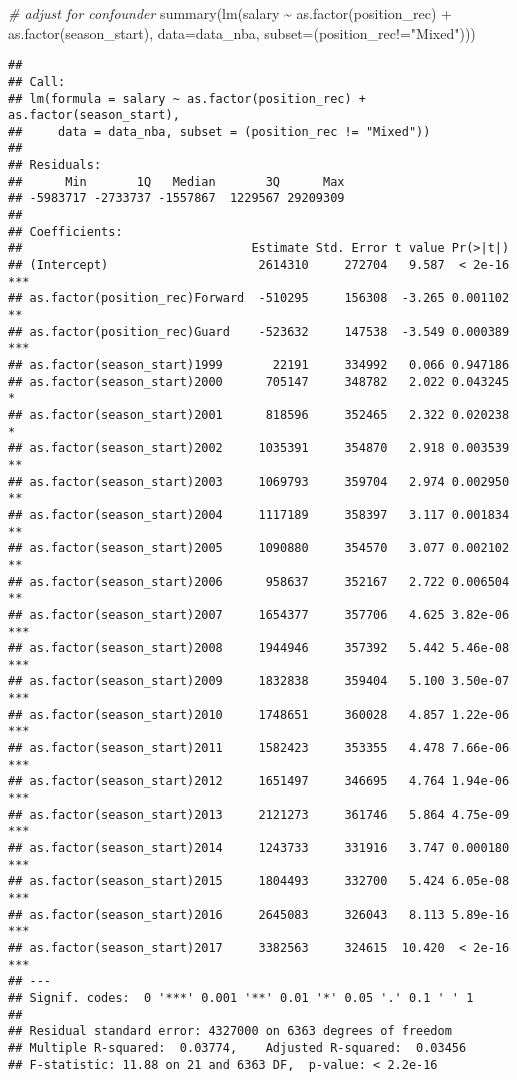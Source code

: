 \documentclass[
]{book}
\newenvironment{Shaded}{\begin{snugshade}}{\end{snugshade}}
\newcommand{\AttributeTok}[1]{\textcolor[rgb]{0.77,0.63,0.00}{#1}}
\newcommand{\CommentTok}[1]{\textcolor[rgb]{0.56,0.35,0.01}{\textit{#1}}}
\newcommand{\FunctionTok}[1]{\textcolor[rgb]{0.00,0.00,0.00}{#1}}
\newcommand{\NormalTok}[1]{#1}
\newcommand{\SpecialCharTok}[1]{\textcolor[rgb]{0.00,0.00,0.00}{#1}}
\newcommand{\StringTok}[1]{\textcolor[rgb]{0.31,0.60,0.02}{#1}}
\begin{document}
\begin{Shaded}
\begin{Highlighting}[]
\CommentTok{\# adjust for confounder }
\FunctionTok{summary}\NormalTok{(}\FunctionTok{lm}\NormalTok{(salary }\SpecialCharTok{\textasciitilde{}} \FunctionTok{as.factor}\NormalTok{(position\_rec) }\SpecialCharTok{+} \FunctionTok{as.factor}\NormalTok{(season\_start), }\AttributeTok{data=}\NormalTok{data\_nba, }\AttributeTok{subset=}\NormalTok{(position\_rec}\SpecialCharTok{!=}\StringTok{"Mixed"}\NormalTok{)))}
\end{Highlighting}
\end{Shaded}

\begin{verbatim}
## 
## Call:
## lm(formula = salary ~ as.factor(position_rec) + as.factor(season_start), 
##     data = data_nba, subset = (position_rec != "Mixed"))
## 
## Residuals:
##      Min       1Q   Median       3Q      Max 
## -5983717 -2733737 -1557867  1229567 29209309 
## 
## Coefficients:
##                                Estimate Std. Error t value Pr(>|t|)    
## (Intercept)                     2614310     272704   9.587  < 2e-16 ***
## as.factor(position_rec)Forward  -510295     156308  -3.265 0.001102 ** 
## as.factor(position_rec)Guard    -523632     147538  -3.549 0.000389 ***
## as.factor(season_start)1999       22191     334992   0.066 0.947186    
## as.factor(season_start)2000      705147     348782   2.022 0.043245 *  
## as.factor(season_start)2001      818596     352465   2.322 0.020238 *  
## as.factor(season_start)2002     1035391     354870   2.918 0.003539 ** 
## as.factor(season_start)2003     1069793     359704   2.974 0.002950 ** 
## as.factor(season_start)2004     1117189     358397   3.117 0.001834 ** 
## as.factor(season_start)2005     1090880     354570   3.077 0.002102 ** 
## as.factor(season_start)2006      958637     352167   2.722 0.006504 ** 
## as.factor(season_start)2007     1654377     357706   4.625 3.82e-06 ***
## as.factor(season_start)2008     1944946     357392   5.442 5.46e-08 ***
## as.factor(season_start)2009     1832838     359404   5.100 3.50e-07 ***
## as.factor(season_start)2010     1748651     360028   4.857 1.22e-06 ***
## as.factor(season_start)2011     1582423     353355   4.478 7.66e-06 ***
## as.factor(season_start)2012     1651497     346695   4.764 1.94e-06 ***
## as.factor(season_start)2013     2121273     361746   5.864 4.75e-09 ***
## as.factor(season_start)2014     1243733     331916   3.747 0.000180 ***
## as.factor(season_start)2015     1804493     332700   5.424 6.05e-08 ***
## as.factor(season_start)2016     2645083     326043   8.113 5.89e-16 ***
## as.factor(season_start)2017     3382563     324615  10.420  < 2e-16 ***
## ---
## Signif. codes:  0 '***' 0.001 '**' 0.01 '*' 0.05 '.' 0.1 ' ' 1
## 
## Residual standard error: 4327000 on 6363 degrees of freedom
## Multiple R-squared:  0.03774,    Adjusted R-squared:  0.03456 
## F-statistic: 11.88 on 21 and 6363 DF,  p-value: < 2.2e-16
\end{verbatim}
\end{document}
